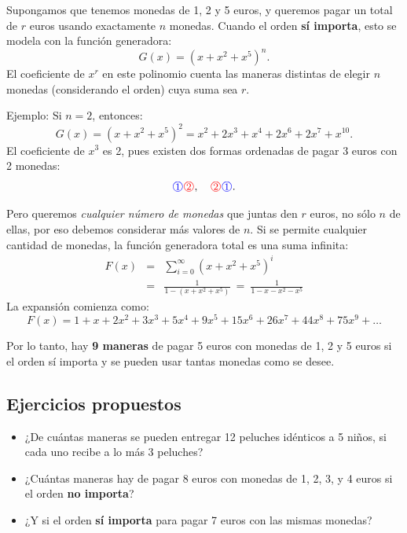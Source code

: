 Supongamos que tenemos monedas de 1, 2 y 5 euros, y queremos pagar un total de $r$ euros usando exactamente $n$ monedas. Cuando el orden \textbf{sí importa}, esto se modela con la función generadora:
$$
G(x) = (x + x^2 + x^5)^n.
$$
El coeficiente de $x^r$ en este polinomio cuenta las maneras distintas de elegir $n$ monedas (considerando el orden) cuya suma sea $r$.


\begin{exampleblock}{Ejemplo: } 
Si $n = 2$, entonces:
$$
G(x) = (x + x^2 + x^5)^2 = x^2 + 2x^3 + x^4 + 2x^6 + 2x^7 + x^{10}.
$$
El coeficiente de $x^3$ es 2, pues existen dos formas ordenadas de pagar 3 euros con 2 monedas:
$$
\circledone\circledtwo, \quad \circledtwo\circledone.
$$
\end{exampleblock}

\medskip

Pero queremos \emph{cualquier n\'umero de monedas} que juntas den $r$ euros, no s\'olo $n$ de ellas, por eso debemos considerar m\'as valores de $n$.
Si se permite cualquier cantidad de monedas, la función generadora total es una suma infinita:
\begin{eqnarray*}
F(x) & = & \sum^\infty_{i=0}(x + x^2 + x^5)^i \\
& = &  \frac{1}{1-(x+x^2+x^5)} ~=~ \frac{1}{1-x-x^2-x^5} 
\end{eqnarray*} 
La expansión comienza como:
$$
F(x) = 1 + x + 2x^2 + 3x^3 + 5x^4 + \boxed{9x^5} + 15x^6 + 26x^7 + 44x^8 + 75x^9 + \dots
$$

Por lo tanto, hay \textbf{9 maneras} de pagar 5 euros con monedas de 1, 2 y 5 euros si el orden sí importa y se pueden usar tantas monedas como se desee.






\subsection*{Ejercicios propuestos}
\begin{itemize}
\item ¿De cuántas maneras se pueden entregar 12 peluches idénticos a 5 niños, si cada uno recibe a lo más 3 peluches?
\item ¿Cuántas maneras hay de pagar 8 euros con monedas de 1, 2, 3, y 4 euros si el orden \textbf{no importa}?
\item ¿Y si el orden \textbf{sí importa} para pagar 7 euros con las mismas monedas?
\end{itemize}



